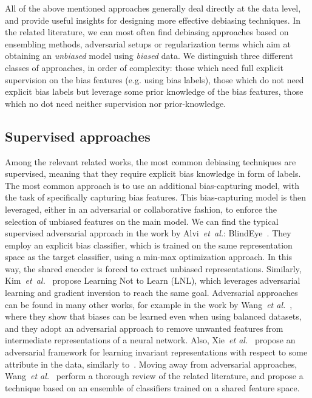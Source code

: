 All of the above mentioned approaches generally deal directly at the data level, and provide useful insights for designing more effective debiasing techniques. 
In the related literature, we can most often find debiasing approaches based on ensembling methods, adversarial setups or regularization terms which aim at obtaining an \emph{unbiased} model using \emph{biased} data. We distinguish three different classes of approaches, in order of complexity: those which need full explicit supervision on the bias features (e.g. using bias labels), those which do not need explicit bias labels but leverage some prior knowledge of the bias features, those which no dot need neither supervision nor prior-knowledge.

\subsection{Supervised approaches}
Among the relevant related works, the most common debiasing techniques are supervised, meaning that they require explicit bias knowledge in form of labels. The most common approach is to use an additional bias-capturing model, with the task of specifically capturing bias features. This bias-capturing model is then leveraged, either in an adversarial or collaborative fashion, to enforce the selection of unbiased features on the main model. 
We can find the typical supervised adversarial approach in the work by Alvi~\emph{et~al.}: BlindEye~\cite{alvi2018turning}. They employ an explicit bias classifier, which is trained on the same representation space as the target classifier, using a min-max optimization approach. In this way, the shared encoder is forced to extract unbiased representations.
Similarly, Kim~\emph{et~al.}~\cite{Kim_2019_CVPR} propose Learning Not to Learn (LNL), which leverages adversarial learning and gradient inversion to reach the same goal.
Adversarial approaches can be found in many other works, for example in the work by Wang~\emph{et al.}~\cite{wang2019iccv}, where they show that biases can be learned even when using balanced datasets, and they adopt an adversarial approach to remove unwanted features from intermediate representations of a neural network. 
Also, Xie~\emph{et al.}~\cite{Xie2017ControllableIT} propose an adversarial framework for learning invariant representations with respect to some attribute in the data, similarly to~\cite{alvi2018turning}.
Moving away from adversarial approaches, Wang~\emph{et al.}~\cite{wang2020fair} perform a thorough review of the related literature, and propose a technique based on an ensemble of classifiers trained on a shared feature space.
